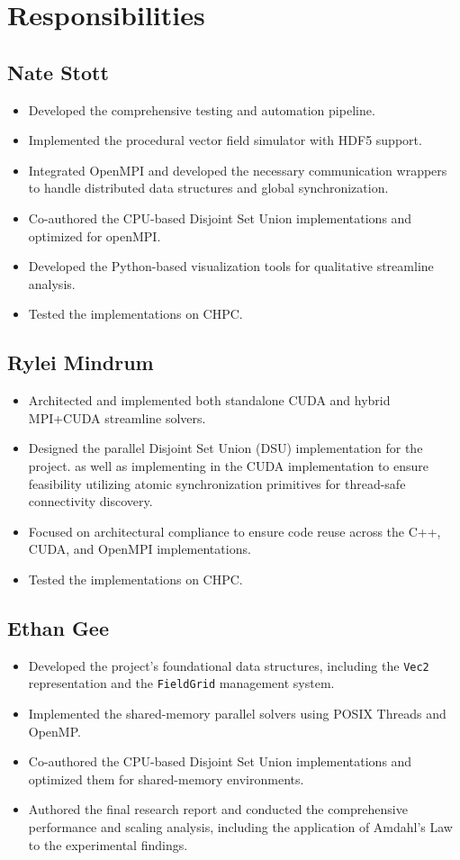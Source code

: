 \section{Responsibilities}

\subsection{Nate Stott}
\begin{itemize}
	\item Developed the comprehensive testing and automation pipeline.
	\item Implemented the procedural vector field simulator with HDF5 support.
	\item Integrated OpenMPI and developed the necessary communication wrappers to handle distributed data structures and global synchronization.
	\item Co-authored the CPU-based Disjoint Set Union implementations and optimized for openMPI.
	\item Developed the Python-based visualization tools for qualitative streamline analysis.
	\item Tested the implementations on CHPC.
\end{itemize}

\subsection{Rylei Mindrum}
\begin{itemize}
	\item Architected and implemented both standalone CUDA and hybrid MPI+CUDA streamline solvers.
	\item Designed the parallel Disjoint Set Union (DSU) implementation for the project.
	      as well as implementing in the CUDA implementation to ensure feasibility utilizing atomic synchronization primitives for thread-safe connectivity discovery.
	\item Focused on architectural compliance to ensure code reuse across the C++, CUDA, and OpenMPI implementations.
	\item Tested the implementations on CHPC.

\end{itemize}

\subsection{Ethan Gee}
\begin{itemize}
	\item Developed the project's foundational data structures, including the \texttt{Vec2} representation and the \texttt{FieldGrid} management system.
	\item Implemented the shared-memory parallel solvers using POSIX Threads and OpenMP.
	\item Co-authored the CPU-based Disjoint Set Union implementations and optimized them for shared-memory environments.
	\item Authored the final research report and conducted the comprehensive performance and scaling analysis, including the application of Amdahl's Law to the experimental findings.
\end{itemize}
